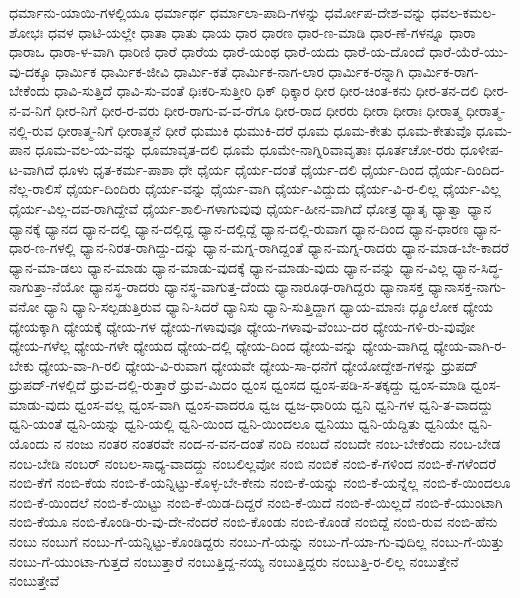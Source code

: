 {ಧರ್ಮಾನು-ಯಾಯಿ-ಗಳಲ್ಲಿಯೂ
ಧರ್ಮಾರ್ಥ
ಧರ್ಮಾಲಾ-ಪಾದಿ-ಗಳನ್ನು
ಧರ್ಮೋಪ-ದೇಶ-ವನ್ನು
ಧವಲ-ಕಮಲ-ಶೋಭಃ
ಧವಳ
ಧಾಟಿ-ಯಲ್ಲೇ
ಧಾತಾ
ಧಾತು
ಧಾಯ
ಧಾರ
ಧಾರಣ
ಧಾರ-ಣ-ಮಾಡಿ
ಧಾರ-ಣೆ-ಗಳನ್ನೂ
ಧಾರಾ
ಧಾರಾಒ
ಧಾರಾ-ಳ-ವಾಗಿ
ಧಾರಿಣಿ
ಧಾರೆ
ಧಾರೆಯ
ಧಾರೆ-ಯಂಥ
ಧಾರೆ-ಯದು
ಧಾರೆ-ಯ-ದೊಂದೆ
ಧಾರೆ-ಯೆರೆ-ಯು-ವು-ದಕ್ಕೂ
ಧಾರ್ಮಿಕ
ಧಾರ್ಮಿಕ-ಜೀವಿ
ಧಾರ್ಮಿ-ಕತೆ
ಧಾರ್ಮಿಕ-ನಾಗ-ಲಾರ
ಧಾರ್ಮಿಕ-ರನ್ನಾಗಿ
ಧಾರ್ಮಿಕ-ರಾಗ-ಬೇಕೆಂದು
ಧಾವಿ-ಸುತ್ತಿದೆ
ಧಾವಿ-ಸು-ವಂತೆ
ಧಿಃಕರಿ-ಸುತ್ತೀರಿ
ಧಿಕ್
ಧಿಕ್ಕಾರ
ಧೀರ
ಧೀರ-ಚಿಂತ-ಕನು
ಧೀರ-ತನ-ದಲಿ
ಧೀರ-ನ-ವ-ನಿಗೆ
ಧೀರ-ನಿಗೆ
ಧೀರ-ರ-ವರು
ಧೀರ-ರಾಗು-ವ-ವ-ರೆಗೂ
ಧೀರ-ರಾದ
ಧೀರರು
ಧೀರಾ
ಧೀರಾಃ
ಧೀರಾತ್ಮ
ಧೀರಾತ್ಮ-ನಲ್ಲಿ-ರುವ
ಧೀರಾತ್ಮ-ನಿಗೆ
ಧೀರಾತ್ಮನೆ
ಧೀರೆ
ಧುಮುಕಿ
ಧುಮುಕಿ-ದರೆ
ಧೂಮ
ಧೂಮ-ಕೇತು
ಧೂಮ-ಕೇತುವೊ
ಧೂಮ-ಪಾನ
ಧೂಮ-ವಲ-ಯ-ವನ್ನು
ಧೂಮಾವೃತ-ದಲಿ
ಧೂಮೆ
ಧೂಮೇ-ನಾಗ್ನಿರಿವಾವೃತಾಃ
ಧೂರ್ತಚೋ-ರರು
ಧೂಳೀಪ-ಟ-ವಾಗಿದೆ
ಧೂಳು
ಧೃತ-ಕರ್ಮ-ಪಾಶಾ
ಧೇ
ಧೈರ್ಯ
ಧೈರ್ಯ-ದಂತೆ
ಧೈರ್ಯ-ದಲಿ
ಧೈರ್ಯ-ದಿಂದ
ಧೈರ್ಯ-ದಿಂದಿದ-ನೆಲ್ಲ-ರಾಲಿಸೆ
ಧೈರ್ಯ-ದಿಂದಿರು
ಧೈರ್ಯ-ವನ್ನು
ಧೈರ್ಯ-ವಾಗಿ
ಧೈರ್ಯ-ವಿದ್ದುದು
ಧೈರ್ಯ-ವಿ-ರ-ಲಿಲ್ಲ
ಧೈರ್ಯ-ವಿಲ್ಲ
ಧೈರ್ಯ-ವಿಲ್ಲ-ದವ-ರಾಗಿದ್ದೇವೆ
ಧೈರ್ಯ-ಶಾಲಿ-ಗಳಾಗುವುವು
ಧೈರ್ಯ-ಹೀನ-ವಾಗಿದೆ
ಧೋತ್ರ
ಧ್ಯಾತೃ
ಧ್ಯಾತ್ವಾ
ಧ್ಯಾನ
ಧ್ಯಾನಕ್ಕೆ
ಧ್ಯಾನದ
ಧ್ಯಾನ-ದಲ್ಲಿ
ಧ್ಯಾನ-ದಲ್ಲಿದ್ದ
ಧ್ಯಾನ-ದಲ್ಲಿದ್ದೆ
ಧ್ಯಾನ-ದಲ್ಲಿ-ರುವಾಗ
ಧ್ಯಾನ-ದಿಂದ
ಧ್ಯಾನ-ಧಾರಣ
ಧ್ಯಾನ-ಧಾರ-ಣ-ಗಳಲ್ಲಿ
ಧ್ಯಾನ-ನಿರತ-ರಾಗಿದ್ದು-ದನ್ನು
ಧ್ಯಾನ-ಮಗ್ನ-ರಾಗಿದ್ದಂತೆ
ಧ್ಯಾನ-ಮಗ್ನ-ರಾದರು
ಧ್ಯಾನ-ಮಾಡ-ಬೇ-ಕಾದರೆ
ಧ್ಯಾನ-ಮಾ-ಡಲು
ಧ್ಯಾನ-ಮಾಡು
ಧ್ಯಾನ-ಮಾಡು-ವುದಕ್ಕೆ
ಧ್ಯಾನ-ಮಾಡು-ವುದು
ಧ್ಯಾನ-ವನ್ನು
ಧ್ಯಾನ-ವಿಲ್ಲ
ಧ್ಯಾನ-ಸಿದ್ಧ-ನಾಗುತ್ತಾ-ನೆಯೋ
ಧ್ಯಾನಸ್ಥ-ರಾದರು
ಧ್ಯಾನಸ್ಥ-ವಾಗುತ್ತ-ದೆಂದು
ಧ್ಯಾನಾರೂಢ-ರಾಗಿದ್ದರು
ಧ್ಯಾನಾಸಕ್ತ
ಧ್ಯಾನಾಸಕ್ತ-ನಾಗು-ವನೋ
ಧ್ಯಾನಿ
ಧ್ಯಾನಿ-ಸಲ್ಪಡುತ್ತಿರುವ
ಧ್ಯಾನಿ-ಸಿದರೆ
ಧ್ಯಾನಿಸು
ಧ್ಯಾನಿ-ಸುತ್ತಿದ್ದಾಗ
ಧ್ಯಾಯ-ಮಾನಃ
ಧ್ಯೂಲೋಕ
ಧ್ಯೇಯ
ಧ್ಯೇಯಕ್ಕಾಗಿ
ಧ್ಯೇಯಕ್ಕೆ
ಧ್ಯೇಯ-ಗಳ
ಧ್ಯೇಯ-ಗಳಾವುವೂ
ಧ್ಯೇಯ-ಗಳಾವು-ವೆಂಬು-ದರ
ಧ್ಯೇಯ-ಗಳಿ-ರು-ವುವೋ
ಧ್ಯೇಯ-ಗಳೆಲ್ಲ
ಧ್ಯೇಯ-ಗಳೇ
ಧ್ಯೇಯದ
ಧ್ಯೇಯ-ದಲ್ಲಿ
ಧ್ಯೇಯ-ದಿಂದ
ಧ್ಯೇಯ-ವನ್ನು
ಧ್ಯೇಯ-ವಾಗಿದ್ದ
ಧ್ಯೇಯ-ವಾಗಿ-ರ-ಬೇಕು
ಧ್ಯೇಯ-ವಾ-ಗಿ-ರಲಿ
ಧ್ಯೇಯ-ವಿ-ರುವಾಗ
ಧ್ಯೇಯವೇ
ಧ್ಯೇಯ-ಸಾ-ಧನೆಗೆ
ಧ್ಯೇಯೋದ್ದೇಶ-ಗಳನ್ನು
ಧ್ರುಪದ್
ಧ್ರುಪದ್-ಗಳಲ್ಲಿದೆ
ಧ್ರುವ-ದಲ್ಲಿ-ರುತ್ತಾರೆ
ಧ್ರುವ-ಮಿದಂ
ಧ್ವಂಸ
ಧ್ವಂಸದ
ಧ್ವಂಸ-ಪಡಿ-ಸ-ತಕ್ಕದ್ದು
ಧ್ವಂಸ-ಮಾಡಿ
ಧ್ವಂಸ-ಮಾಡು-ವುದು
ಧ್ವಂಸ-ವಲ್ಲ
ಧ್ವಂಸ-ವಾಗಿ
ಧ್ವಂಸ-ವಾದರೂ
ಧ್ವಜ
ಧ್ವಜ-ಧಾರಿಯ
ಧ್ವನಿ
ಧ್ವನಿ-ಗಳ
ಧ್ವನಿ-ತ-ವಾದದ್ದು
ಧ್ವನಿ-ಯಂತೆ
ಧ್ವನಿ-ಯನ್ನು
ಧ್ವನಿ-ಯಲ್ಲಿ
ಧ್ವನಿ-ಯಿಂದ
ಧ್ವನಿ-ಯಿಂದಲೂ
ಧ್ವನಿಯು
ಧ್ವನಿ-ಯೆದ್ದಿತು
ಧ್ವನಿಯೇ
ಧ್ವನಿ-ಯೊಂದು
ನ
ನಂಜು
ನಂತರ
ನಂತರವೇ
ನಂದ-ನ-ವನ-ದಂತೆ
ನಂದಿ
ನಂಬದೆ
ನಂಬದೇ
ನಂಬ-ಬೇಕೆಂದು
ನಂಬ-ಬೇಡ
ನಂಬ-ಬೇಡಿ
ನಂಬರ್
ನಂಬಲ-ಸಾಧ್ಯ-ವಾದದ್ದು
ನಂಬಲಿಲ್ಲವೋ
ನಂಬಿ
ನಂಬಿಕೆ
ನಂಬಿ-ಕೆ-ಗಳಿಂದ
ನಂಬಿ-ಕೆ-ಗಳೆಂದರೆ
ನಂಬಿ-ಕೆಗೆ
ನಂಬಿ-ಕೆಯ
ನಂಬಿ-ಕೆ-ಯನ್ನಿಟ್ಟು-ಕೊಳ್ಳ-ಬೇ-ಕೇನು
ನಂಬಿ-ಕೆ-ಯನ್ನು
ನಂಬಿ-ಕೆ-ಯನ್ನೆಲ್ಲ
ನಂಬಿ-ಕೆ-ಯಿಂದಲೂ
ನಂಬಿ-ಕೆ-ಯಿಂದಲೆ
ನಂಬಿ-ಕೆ-ಯಿಟ್ಟು
ನಂಬಿ-ಕೆ-ಯಿಡ-ದಿದ್ದರೆ
ನಂಬಿ-ಕೆ-ಯಿದೆ
ನಂಬಿ-ಕೆ-ಯಿಲ್ಲದೆ
ನಂಬಿ-ಕೆ-ಯುಂಟಾಗಿ
ನಂಬಿ-ಕೆಯೂ
ನಂಬಿ-ಕೊಂಡಿ-ರು-ವು-ದೇ-ನೆಂದರೆ
ನಂಬಿ-ಕೊಂಡು
ನಂಬಿ-ಕೊಂಡೆ
ನಂಬಿದ್ದೆ
ನಂಬಿ-ರುವ
ನಂಬಿ-ಹೆನು
ನಂಬು
ನಂಬುಗೆ
ನಂಬು-ಗೆ-ಯನ್ನಿಟ್ಟು-ಕೊಂಡಿದ್ದರು
ನಂಬು-ಗೆ-ಯನ್ನು
ನಂಬು-ಗೆ-ಯಾ-ಗು-ವುದಿಲ್ಲ
ನಂಬು-ಗೆ-ಯಿತ್ತು
ನಂಬು-ಗೆ-ಯುಂಟಾ-ಗುತ್ತದೆ
ನಂಬುತ್ತಾರೆ
ನಂಬುತ್ತಿದ್ದ-ನಯ್ಯ
ನಂಬುತ್ತಿದ್ದರು
ನಂಬುತ್ತಿ-ರ-ಲಿಲ್ಲ
ನಂಬುತ್ತೇನೆ
ನಂಬುತ್ತೇವೆ
}
